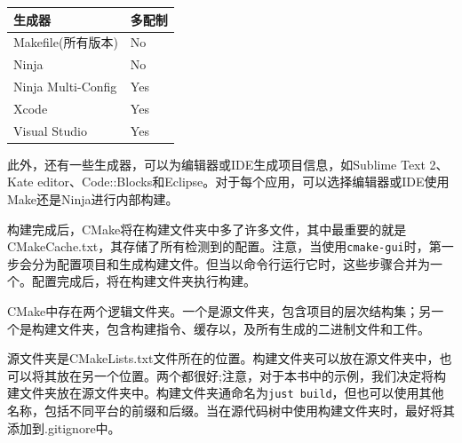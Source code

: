 \begin{table}[H]
	\centering
	\begin{tabular}{|l|l|}
		\hline
		\textbf{生成器}                                                                                                                  &  \textbf{多配制}                                                            \\ \hline
		Makefile(所有版本)                                                                                                                                  &                                                                           No       \\  \hline
		Ninja              &                                                                                  No\\  \hline
		Ninja Multi-Config  &  Yes                                                                                \\ \hline
    Xcode              &                                                                                  Yes\\  \hline
    Visual Studio              &                                                                                  Yes\\  \hline
	\end{tabular}
\end{table}

此外，还有一些生成器，可以为编辑器或IDE生成项目信息，如Sublime Text 2、Kate editor、Code::Blocks和Eclipse。对于每个应用，可以选择编辑器或IDE使用Make还是Ninja进行内部构建。

构建完成后，CMake将在构建文件夹中多了许多文件，其中最重要的就是CMakeCache.txt，其存储了所有检测到的配置。注意，当使用\texttt{cmake-gui}时，第一步会分为配置项目和生成构建文件。但当以命令行运行它时，这些步骤合并为一个。配置完成后，将在构建文件夹执行构建。


CMake中存在两个逻辑文件夹。一个是源文件夹，包含项目的层次结构集；另一个是构建文件夹，包含构建指令、缓存以，及所有生成的二进制文件和工件。

源文件夹是CMakeLists.txt文件所在的位置。构建文件夹可以放在源文件夹中，也可以将其放在另一个位置。两个都很好;注意，对于本书中的示例，我们决定将构建文件夹放在源文件夹中。构建文件夹通命名为\texttt{just build}，但也可以使用其他名称，包括不同平台的前缀和后缀。当在源代码树中使用构建文件夹时，最好将其添加到.gitignore中。

